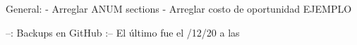 

General:
- Arreglar ANUM sections
- Arreglar costo de oportunidad EJEMPLO

--: Backups en GitHub :--
El último fue el /12/20 a las 